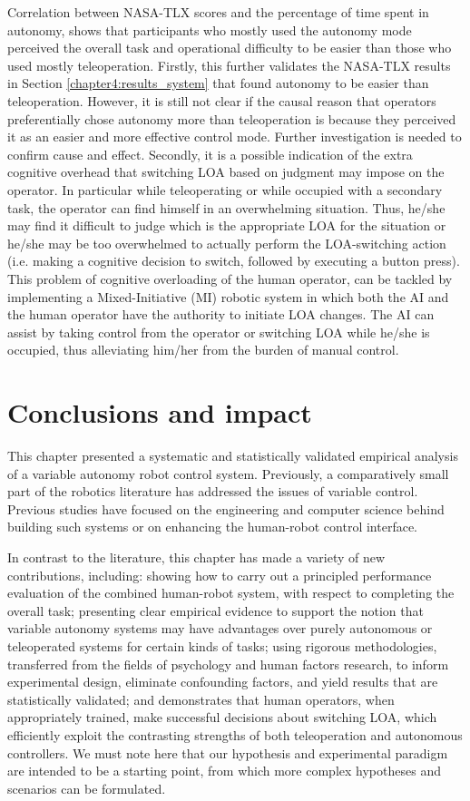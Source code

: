 \documentclass[a4paper,12pt,oneside,openright]{bhamthesis}
\begin{document}
Correlation between NASA-TLX scores and the percentage of time spent in autonomy, shows that participants who mostly used the autonomy mode perceived the overall task and operational difficulty to be easier than those who used mostly teleoperation. Firstly, this further validates the NASA-TLX results in Section \ref{chapter4:results_system} that found autonomy to be easier than teleoperation. However, it is still not clear if the causal reason that operators preferentially chose autonomy more than teleoperation is because they perceived it as an easier and more effective control mode. Further investigation is needed to confirm cause and effect. Secondly, it is a possible indication of the extra cognitive overhead that switching LOA based on judgment may impose on the operator. In particular while teleoperating or while occupied with a secondary task, the operator can find himself in an overwhelming situation. Thus, he/she may find it difficult to judge which is the appropriate LOA for the situation or he/she may be too overwhelmed to actually perform the LOA-switching action (i.e. making a cognitive decision to switch, followed by executing a button press). This problem of cognitive overloading of the human operator, can be tackled by implementing a Mixed-Initiative (MI) robotic system in which both the AI and the human operator have the authority to initiate LOA changes. The AI can assist by taking control from the operator or switching LOA while he/she is occupied, thus alleviating him/her from the burden of manual control.


\section{Conclusions and impact}
\label{chap4:conclusion} 
This chapter presented a systematic and statistically validated empirical analysis of a variable autonomy robot control system. Previously, a comparatively small part of the robotics literature has addressed the issues of variable control. Previous studies have focused on the engineering and computer science behind building such systems or on enhancing the human-robot control interface. 

In contrast to the literature, this chapter has made a variety of new contributions, including: showing how to carry out a principled performance evaluation of the combined human-robot system, with respect to completing the overall task; presenting clear empirical evidence to support the notion that variable autonomy systems may have advantages over purely autonomous or teleoperated systems for certain kinds of tasks; using rigorous methodologies, transferred from the fields of psychology and human factors research, to inform experimental design, eliminate confounding factors, and yield results that are statistically validated; and demonstrates that human operators, when appropriately trained, make successful decisions about switching LOA, which efficiently exploit the contrasting strengths of both teleoperation and autonomous controllers. We must note here that our hypothesis and experimental paradigm are intended to be a starting point, from which more complex hypotheses and scenarios can be formulated.
\end{document}
